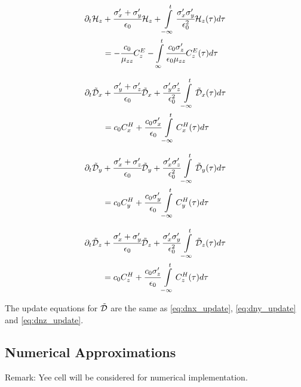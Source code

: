 \begin{align}
    \partial_t\mathcal{H}_z
    &+
    \cfrac{\sigma_x^{\prime} + \sigma_y^{\prime}}{\epsilon_0}\mathcal{H}_z
    +
    \int\limits_{-\infty}^t\cfrac{\sigma_x^{\prime}\sigma_y^{\prime}}{\epsilon_0^2}\mathcal{H}_z(\tau)d\tau \nonumber \\
    &= 
    -\cfrac{c_0}{\mu_{zz}}C_z^E
    -\int\limits_{\infty}^t\cfrac{c_0\sigma_z^{\prime}}{\epsilon_0\mu_{zz}}C_z^E(\tau)d\tau
    \label{eq:Hz_upml_time}
\end{align}

\begin{align}
    \partial_t\tilde{\mathcal{D}}_x
    &+
    \cfrac{\sigma_y^{\prime} + \sigma_z^{\prime}}{\epsilon_0}\tilde{\mathcal{D}}_x
    +
    \cfrac{\sigma_y^{\prime} \sigma_z^{\prime}}{\epsilon_0^2} \int\limits_{-\infty}^t\tilde{\mathcal{D}}_x(\tau)d\tau 
    \nonumber \\
    &=
    c_0C_x^H
    +
    \cfrac{c_0\sigma_x^{\prime}}{\epsilon_0}\int\limits_{-\infty}^tC_x^H(\tau)d\tau
    \label{eq:Dx_upml_time}
\end{align}

\begin{align}
    \partial_t\tilde{\mathcal{D}}_y
    &+
    \cfrac{\sigma_x^{\prime} + \sigma_z^{\prime}}{\epsilon_0}\tilde{\mathcal{D}}_y
    +
    \cfrac{\sigma_x^{\prime} \sigma_z^{\prime}}{\epsilon_0^2} \int\limits_{-\infty}^t\tilde{\mathcal{D}}_y(\tau)d\tau 
    \nonumber \\
    &=
    c_0C_y^H
    +
    \cfrac{c_0\sigma_y^{\prime}}{\epsilon_0}\int\limits_{-\infty}^tC_y^H(\tau)d\tau
    \label{eq:Dy_upml_time}
\end{align}

\begin{align}
    \partial_t\tilde{\mathcal{D}}_z
    &+
    \cfrac{\sigma_x^{\prime} + \sigma_y^{\prime}}{\epsilon_0}\tilde{\mathcal{D}}_z
    +
    \cfrac{\sigma_x^{\prime} \sigma_y^{\prime}}{\epsilon_0^2} \int\limits_{-\infty}^t\tilde{\mathcal{D}}_z(\tau)d\tau 
    \nonumber \\
    &=
    c_0C_z^H
    +
    \cfrac{c_0\sigma_z^{\prime}}{\epsilon_0}\int\limits_{-\infty}^tC_z^H(\tau)d\tau
    \label{eq:Dz_upml_time}
\end{align}

The update equations for $\tilde{\mathcal{D}}$ are the same as \eqref{eq:dnx_update}, \eqref{eq:dny_update} and \eqref{eq:dnz_update}.

\subsection{Numerical Approximations}

Remark: Yee cell will be considered for numerical implementation.

